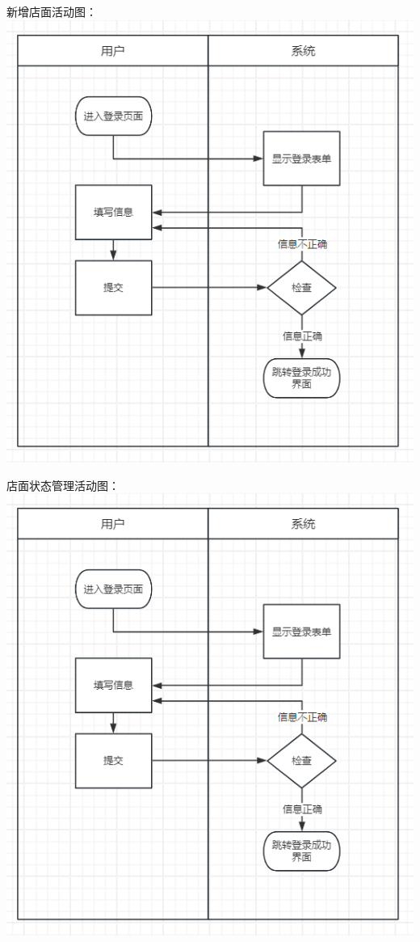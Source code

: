 \documentclass[]{article}
\begin{document}
新增店面活动图：
\includegraphics{media/media/image1.png}

店面状态管理活动图：
\includegraphics{media/media/image1.png}
\end{document}
